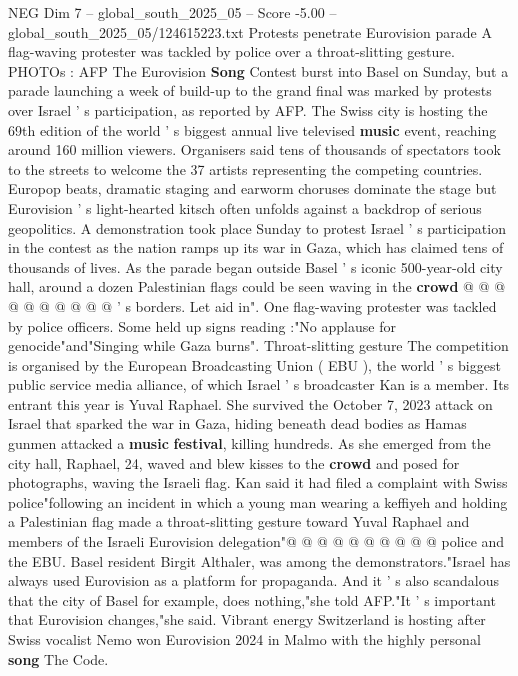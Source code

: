 \begin{textsample}{NEG Dim 7 – global\_south\_2025\_05 – Score -5.00 – global\_south\_2025\_05/124615223.txt}  \label{ex:f7_neg_214}
Protests penetrate Eurovision parade A flag-waving protester was tackled by police over a throat-slitting gesture.
PHOTOs : AFP The Eurovision \textbf{Song} Contest burst into Basel on Sunday, but a parade launching a week of build-up to the grand final was marked by protests over Israel ' s participation, as reported by AFP.
The Swiss city is hosting the 69th edition of the world ' s biggest annual live televised \textbf{music} event, reaching around 160 million viewers.
Organisers said tens of thousands of spectators took to the streets to welcome the 37 artists representing the competing countries.
Europop beats, dramatic staging and earworm choruses dominate the stage but Eurovision ' s light-hearted kitsch often unfolds against a backdrop of serious geopolitics.
A demonstration took place Sunday to protest Israel ' s participation in the contest as the nation ramps up its war in Gaza, which has claimed tens of thousands of lives.
As the parade began outside Basel ' s iconic 500-year-old city hall, around a dozen Palestinian flags could be seen waving in the \textbf{crowd} @ @ @ @ @ @ @ @ @ @ ' s borders.
Let aid in".
One flag-waving protester was tackled by police officers.
Some held up signs reading :"No applause for genocide"and"Singing while Gaza burns".
Throat-slitting gesture The competition is organised by the European Broadcasting Union ( EBU ), the world ' s biggest public service media alliance, of which Israel ' s broadcaster Kan is a member.
Its entrant this year is Yuval Raphael.
She survived the October 7, 2023 attack on Israel that sparked the war in Gaza, hiding beneath dead bodies as Hamas gunmen attacked a \textbf{music} \textbf{festival}, killing hundreds.
As she emerged from the city hall, Raphael, 24, waved and blew kisses to the \textbf{crowd} and posed for photographs, waving the Israeli flag.
Kan said it had filed a complaint with Swiss police"following an incident in which a young man wearing a keffiyeh and holding a Palestinian flag made a throat-slitting gesture toward Yuval Raphael and members of the Israeli Eurovision delegation"@ @ @ @ @ @ @ @ @ @ police and the EBU.
Basel resident Birgit Althaler, was among the demonstrators."Israel has always used Eurovision as a platform for propaganda.
And it ' s also scandalous that the city of Basel for example, does nothing,"she told AFP."It ' s important that Eurovision changes,"she said.
Vibrant energy Switzerland is hosting after Swiss vocalist Nemo won Eurovision 2024 in Malmo with the highly personal \textbf{song} The Code.

\end{textsample}
